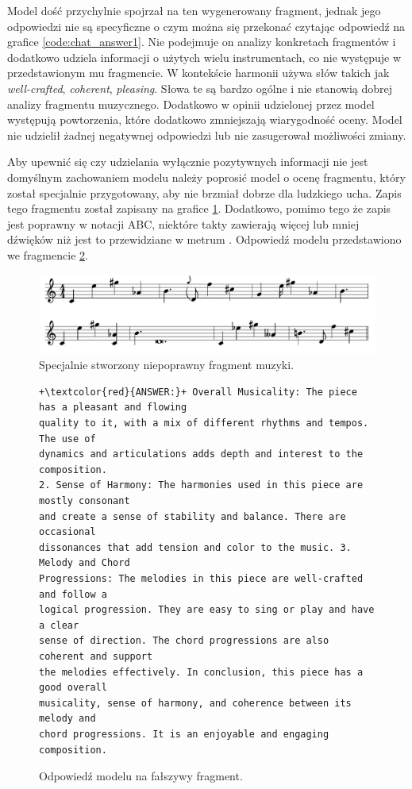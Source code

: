 \documentclass[data-science]{agh-wi} %
\begin{document}
Model dość przychylnie spojrzał na ten wygenerowany fragment, jednak jego odpowiedzi nie są specyficzne o czym można się przekonać czytając odpowiedź na grafice \ref*{code:chat_answer1}. Nie podejmuje on analizy konkretach fragmentów i dodatkowo udziela informacji o użytych wielu instrumentach, co nie występuje w przedstawionym mu fragmencie. W kontekście harmonii używa słów takich jak \textit{well-crafted}, \textit{coherent}, \textit{pleasing}. Słowa te są bardzo ogólne i nie stanowią dobrej analizy fragmentu muzycznego. Dodatkowo w opinii udzielonej przez model występują powtorzenia, które dodatkowo zmniejszają wiarygodność oceny. Model nie udzielił żadnej negatywnej odpowiedzi lub nie zasugerował możliwości zmiany.

Aby upewnić się czy udzielania wyłącznie pozytywnych informacji nie jest domyślnym zachowaniem modelu należy poprosić model o ocenę fragmentu, który został specjalnie przygotowany, aby nie brzmiał dobrze dla ludzkiego ucha. Zapis tego fragmentu został zapisany na grafice \ref*{fig:gen_bad}. Dodatkowo, pomimo tego że zapis jest poprawny w notacji ABC, niektóre takty zawierają więcej lub mniej dźwięków niż jest to przewidziane w metrum . Odpowiedź modelu przedstawiono we fragmencie \ref*{code:chat_prompt2}.

\begin{figure}[ht!]
    \begin{center}
        \includegraphics[width=0.9\linewidth]{./img/abc_gen_notnice1.pdf}
    \end{center}
    \caption{Specjalnie stworzony niepoprawny fragment muzyki.}\label{fig:gen_bad}
\end{figure}

\begin{figure}[ht!]
    \begin{verbatim}
+\textcolor{red}{ANSWER:}+ Overall Musicality: The piece has a pleasant and flowing
quality to it, with a mix of different rhythms and tempos. The use of 
dynamics and articulations adds depth and interest to the composition. 
2. Sense of Harmony: The harmonies used in this piece are mostly consonant 
and create a sense of stability and balance. There are occasional 
dissonances that add tension and color to the music. 3. Melody and Chord 
Progressions: The melodies in this piece are well-crafted and follow a 
logical progression. They are easy to sing or play and have a clear 
sense of direction. The chord progressions are also coherent and support 
the melodies effectively. In conclusion, this piece has a good overall 
musicality, sense of harmony, and coherence between its melody and 
chord progressions. It is an enjoyable and engaging composition.
    \end{verbatim}
    \caption{Odpowiedź modelu na fałszywy fragment.}\label{code:chat_prompt2}
\end{figure}
\end{document}

